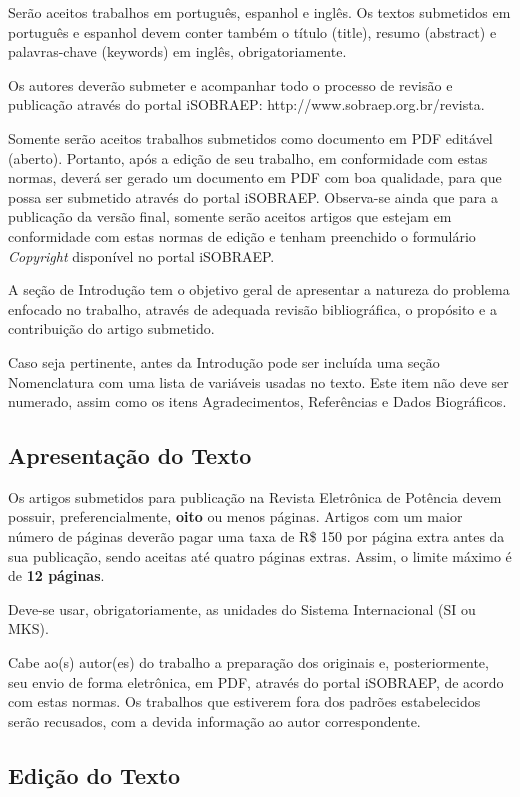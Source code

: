 Serão aceitos trabalhos em português, espanhol e inglês. Os textos submetidos em português e espanhol devem conter também o título (title), resumo (abstract) e palavras-chave (keywords) em inglês, obrigatoriamente.

Os autores deverão submeter e acompanhar todo o processo de revisão e publicação através do portal iSOBRAEP: http://www.sobraep.org.br/revista.

Somente serão aceitos trabalhos submetidos como documento em PDF editável (aberto). Portanto, após a edição de seu trabalho, em conformidade com estas normas, deverá ser gerado um documento em PDF com boa qualidade, para que possa ser submetido através do portal iSOBRAEP. Observa-se ainda que para a publicação da versão final, somente serão aceitos artigos que estejam em conformidade com estas normas de edição e tenham preenchido o formulário \textit{Copyright} disponível no portal iSOBRAEP.

A seção de Introdução tem o objetivo geral de apresentar a natureza do problema enfocado no trabalho, através de adequada revisão bibliográfica, o propósito e a contribuição do artigo submetido.

Caso seja pertinente, antes da Introdução pode ser incluída uma seção Nomenclatura com uma lista de variáveis usadas no texto. Este item não deve ser numerado, assim como os itens Agradecimentos, Referências e Dados Biográficos.

\subsection{Apresentação do Texto}

Os artigos submetidos para publicação na Revista Eletrônica de Potência devem possuir, preferencialmente, \textbf{oito} ou menos páginas. Artigos com um maior número de páginas deverão pagar uma taxa de R\$ 150 por página extra antes da sua publicação, sendo aceitas até quatro páginas extras. Assim, o limite máximo é de \textbf{12 páginas}.

Deve-se usar, obrigatoriamente, as unidades do Sistema Internacional (SI ou MKS).

Cabe ao(s) autor(es) do trabalho a preparação dos originais e, posteriormente, seu envio de forma eletrônica, em PDF, através do portal iSOBRAEP, de acordo com estas normas. Os trabalhos que estiverem fora dos padrões estabelecidos serão recusados, com a devida informação ao autor correspondente. 

\subsection{Edição do Texto}


